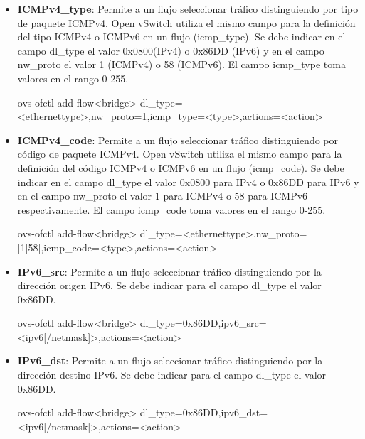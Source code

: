 \begin{itemize}

\item \textbf{ICMPv4\_type}: Permite a un flujo seleccionar tr\'afico distinguiendo por tipo de paquete ICMPv4. Open vSwitch utiliza el mismo campo para la definici\'on del tipo ICMPv4 o ICMPv6 en un flujo (icmp\_type). Se debe indicar en el campo dl\_type el valor 0x0800(IPv4) o 0x86DD (IPv6) y en el campo nw\_proto el valor 1 (ICMPv4) o 58 (ICMPv6). El campo icmp\_type toma valores en el rango 0-255.

\begin{center}
ovs-ofctl add-flow<bridge> dl\_type=<ethernettype>,nw\_proto=1,icmp\_type=<type>,actions=<action>
\end{center}

\item \textbf{ICMPv4\_code}: Permite a un flujo seleccionar tr\'afico distinguiendo por código de paquete ICMPv4. Open vSwitch utiliza el mismo campo para la definici\'on del c\'odigo ICMPv4 o ICMPv6 en un flujo (icmp\_code). Se debe indicar en el campo dl\_type el valor 0x0800 para IPv4 o 0x86DD para IPv6 y en el campo nw\_proto el valor 1 para ICMPv4 o 58 para ICMPv6 respectivamente. El campo icmp\_code toma valores en el rango 0-255.

\begin{center}
ovs-ofctl add-flow<bridge> dl\_type=<ethernettype>,nw\_proto=[1|58],icmp\_code=<type>,actions=<action>
\end{center}

\item \textbf{IPv6\_src}: Permite a un flujo seleccionar tr\'afico distinguiendo por la dirección origen IPv6. Se debe indicar para el campo dl\_type el valor 0x86DD. 

\begin{center}
ovs-ofctl add-flow<bridge> dl\_type=0x86DD,ipv6\_src=<ipv6[/netmask]>,actions=<action>
\end{center}

\item \textbf{IPv6\_dst}: Permite a un flujo seleccionar tr\'afico distinguiendo por la dirección destino IPv6. Se debe indicar para el campo dl\_type el valor 0x86DD. 

\begin{center}
ovs-ofctl add-flow<bridge> dl\_type=0x86DD,ipv6\_dst=<ipv6[/netmask]>,actions=<action>
\end{center}


\end{itemize}
